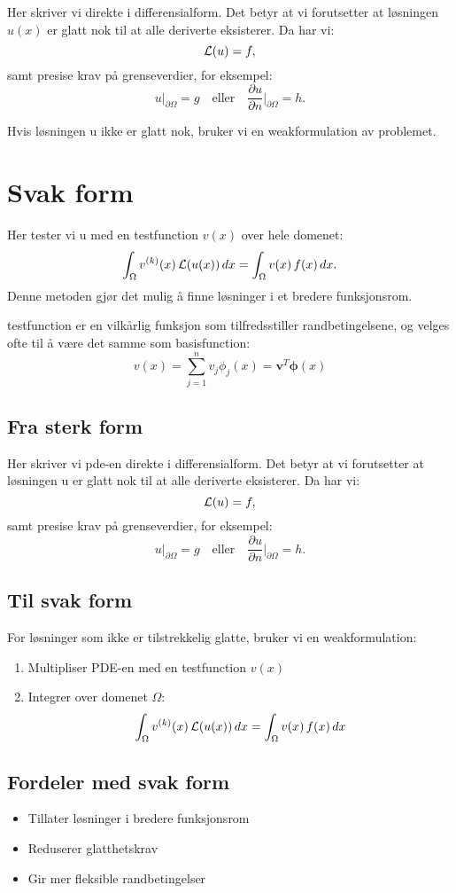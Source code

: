 Her skriver vi  direkte i differensialform.
Det betyr at vi forutsetter at løsningen \(u(x)\) er glatt nok til at alle deriverte eksisterer.
Da har vi:
\[
	\mathcal{L}(u) = f,
\]
samt presise krav på grenseverdier, for eksempel:
\[
	u|_{\partial \Omega} = g \quad \text{eller} \quad \frac{\partial u}{\partial n}\bigg|_{\partial \Omega} = h.
\]

Hvis løsningen u ikke er glatt nok, bruker vi en \gls{weakformulation} av problemet.

\section{Svak form}

Her tester vi u med en \gls{testfunction} \(v(x)\) over hele domenet:
\[
	\int_\Omega v^{(k)}(x) \, \mathcal{L}(u(x)) \, dx = \int_\Omega v(x) \, f(x) \, dx.
\]
Denne metoden gjør det mulig å finne løsninger i et bredere funksjonsrom.

\gls{testfunction} er en vilkårlig funksjon som tilfredsstiller randbetingelsene, og velges ofte til å være det samme som \gls{basisfunction}:
\[
	v(x) = \sum_{j=1}^n v_j \phi_j(x) = \symbf{v}^T \symbf{\phi}(x)
\]


\subsection{Fra sterk form}
Her skriver vi \gls{pde}-en direkte i differensialform. Det betyr at vi forutsetter at løsningen u er glatt nok til at alle deriverte eksisterer. Da har vi:
\[
	\mathcal{L}(u) = f,
\]
samt presise krav på grenseverdier, for eksempel:
\[
	u|_{\partial \Omega} = g \quad \text{eller} \quad \frac{\partial u}{\partial n}\bigg|_{\partial \Omega} = h.
\]

\subsection{Til svak form}
For løsninger som ikke er tilstrekkelig glatte, bruker vi en \gls{weakformulation}:

\begin{enumerate}
	\item Multipliser PDE-en med en \gls{testfunction} $v(x)$
	\item Integrer over domenet $\Omega$:
	      \[
		      \int_\Omega v^{(k)}(x) \, \mathcal{L}(u(x)) \, dx = \int_\Omega v(x) \, f(x) \, dx
	      \]
\end{enumerate}

\subsection{Fordeler med svak form}
\begin{itemize}
	\item Tillater løsninger i bredere funksjonsrom
	\item Reduserer glatthetskrav
	\item Gir mer fleksible randbetingelser
\end{itemize}

